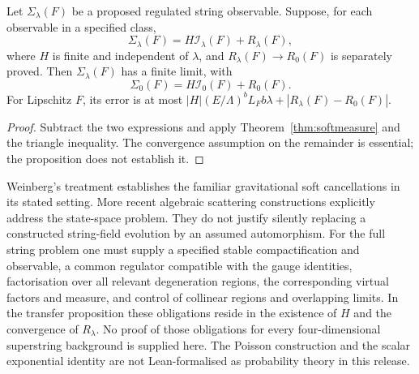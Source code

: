\begin{proposition}
Let $\Sigma_\lambda(F)$ be a proposed regulated string observable. Suppose, for each observable in a specified class,
\[
\Sigma_\lambda(F)=H\mathcal I_\lambda(F)+R_\lambda(F),
\]
where $H$ is finite and independent of $\lambda$, and $R_\lambda(F)\to R_0(F)$ is separately proved. Then $\Sigma_\lambda(F)$ has a finite limit, with
\[
\Sigma_0(F)=H\mathcal I_0(F)+R_0(F).
\]
For Lipschitz $F$, its error is at most $|H|(E/\Lambda)^bL_Fb\lambda+|R_\lambda(F)-R_0(F)|$.
\end{proposition}
\begin{proof}
Subtract the two expressions and apply Theorem~\ref{thm:softmeasure} and the triangle inequality. The convergence assumption on the remainder is essential; the proposition does not establish it.
\end{proof}

 Weinberg's treatment \cite{Weinberg65} establishes the familiar gravitational soft cancellations in its stated setting. More recent algebraic scattering constructions \cite{PSW22,PS24} explicitly address the state-space problem. They do not justify silently replacing a constructed string-field evolution by an assumed automorphism. For the full string problem one must supply a specified stable compactification and observable, a common regulator compatible with the gauge identities, factorisation over all relevant degeneration regions, the corresponding virtual factors and measure, and control of collinear regions and overlapping limits. In the transfer proposition these obligations reside in the existence of $H$ and the convergence of $R_\lambda$. No proof of those obligations for every four-dimensional superstring background is supplied here. The Poisson construction and the scalar exponential identity are not Lean-formalised as probability theory in this release.
